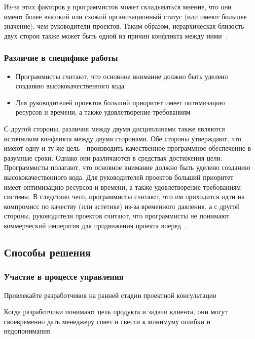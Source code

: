 \documentclass[]{../industrial-development}
\begin{document}
Из-за этих факторов у программистов может складываться мнение, что они имеют более высокий или схожий организационный статус (или имеют большее значение), чем руководители проектов. Таким образом, иерархическая близость двух сторон также может быть одной из причин конфликта между ними~\cite{Awati}.

\begin{frame} \frametitle{Различие в специфике работы} 
\begin{itemize}
\item Программисты считают, что основное внимание должно быть уделено созданию высококачественного кода
\item Для руководителей проектов больший приоритет имеет оптимизацию ресурсов и времени, а также удовлетворение требованиям
\end{itemize}
\end{frame}

\lecturenotes

С другой стороны, различия между двумя дисциплинами также являются источником конфликта между двумя сторонами. 
Обе стороны утверждают, что имеют одну и ту же цель - производить качественное программное обеспечение в разумные сроки. Однако они различаются в средствах достижения цели. Программисты полагают, что основное внимание должно быть уделено созданию высококачественного кода. Для руководителей проектов больший приоритет имеет оптимизацию ресурсов и времени, а также удовлетворение требованиям системы. В следствии чего, программисты считают, что им приходится идти на компромисс по качеству (или эстетике) из-за временного давления, а с другой стороны, руководители проектов считают, что программисты не понимают коммерческий императив для продвижения проекта вперед~\cite{Awati}.

\subsection{Способы решения}

\begin{frame} \frametitle{Участие в процессе управления} 
\begin{block}{}
Привлекайте разработчиков на ранней стадии проектной консультации
\end{block}

Когда разработчики понимают цель продукта и задачи клиента, они могут своевременно дать менеджеру совет и свести к минимуму ошибки и недопонимания
\end{frame}
\end{document}
